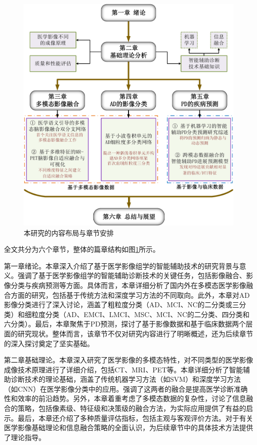    \begin{figure}[ht]
      \centering  
      \includegraphics[width=0.88\linewidth]{figs/wholeWork.pdf}  %
      \caption{本研究的内容布局与章节安排}\label{wholeWorks}
    \end{figure}

全文共分为六个章节，整体的篇章结构如图\ref{wholeWorks}所示。
   
第一章绪论。本章深入介绍了基于医学影像组学的智能辅助技术的研究背景与意义。强调了基于医学影像组学的智能辅助诊断技术的关键任务，包括影像融合、影像分类与疾病预测等方面。具体而言，本章详细分析了国内外在多模态医学影像融合方面的研究，包括基于传统方法和深度学习方法的不同取向。此外，本章对AD影像分类进行了深入讨论，涵盖了粗粒度分类（AD、MCI、NC的二分类或三分类）和细粒度分类（AD、EMCI、LMCI、MSC、MCI、NC的二分类、四分类和六分类）。最后，本章聚焦于PD预测，探讨了基于影像数据和基于临床数据两个层面的研究现状。整体而言，该章节不仅对研究内容进行了明晰概述，还为后续章节的深入探讨奠定了坚实基础。
    

第二章基础理论。本章深入研究了医学影像的多模态特性，对不同类型的医学影像成像技术原理进行了详细介绍，包括CT、MRI、PET等。本章详细分析了智能辅助诊断技术的理论基础，涵盖了传统机器学习方法（如SVM）和深度学习方法（如CNN）在医学影像分类中的应用。强调了这两者的融合是提高医学诊断准确性和效率的前沿趋势。另外，本章着重考虑了多模态数据的复杂性，讨论了信息融合的策略，包括像素级、特征级和决策级的融合方法，为实际应用提供了有益的启示。最后，本章还介绍了多种质量评估指标，包括主观与客观评价方法。对于有关医学影像基础理论和信息融合策略的全面认识，为后续章节中的具体技术方法提供了理论指导。


